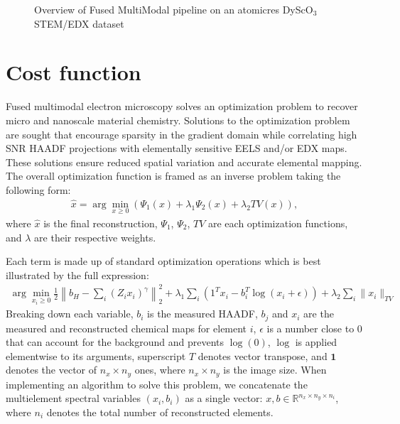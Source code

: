 \documentclass[letterpaper,10pt,english]{jupyterBook}
\let\sphinxpxdimen\pdfpxdimen\else\newdimen\sphinxpxdimen
\begin{document}
\sphinxstepscope

\begin{figure}[htbp]
\centering
\capstart

\noindent\sphinxincludegraphics[width=700\sphinxpxdimen]{{figure_1_math}.png}
\caption{Overview of Fused Multi\sphinxhyphen{}Modal pipeline on an atomic\sphinxhyphen{}res DyScO\(_3\) STEM/EDX dataset}\label{\detokenize{02_math:fig-math}}\end{figure}


\chapter{Cost function}
\label{\detokenize{02_math:cost-function}}\label{\detokenize{02_math::doc}}
\sphinxAtStartPar
Fused multi\sphinxhyphen{}modal electron microscopy solves an optimization problem to recover micro\sphinxhyphen{} and nanoscale material chemistry. Solutions to the optimization problem are sought that encourage sparsity in the gradient domain while correlating high SNR HAADF projections with elementally sensitive EELS and/or EDX maps. These solutions ensure reduced spatial variation and accurate elemental mapping. The overall optimization function is framed as an inverse problem taking the following form:
\begin{equation*}
\begin{split}
\hat{x} = \arg\min_{x\geq 0} \left( \Psi_1(x) + \lambda_1 \Psi_2(x) + \lambda_2 TV(x) \right),
\end{split}
\end{equation*}
\sphinxAtStartPar
where \(\hat{x}\) is the final reconstruction, \(\Psi_1\), \(\Psi_2\), \(TV\) are each optimization functions, and \(\lambda\) are their respective weights.

\sphinxAtStartPar
Each term is made up of standard optimization operations which is best illustrated by the full expression:
\begin{equation*}
\begin{split}
\arg \min_{x_i \geq 0} \frac{1}{2} \left\| b_H - \sum_i (Z_i x_i)^\gamma \right\|_2^2 
+ \lambda_1 \sum_i (1^T x_i - b_i^T \log(x_i + \epsilon))
+ \lambda_2 \sum_i \| x_i \|_{TV} 
\end{split}
\end{equation*}
\sphinxAtStartPar
Breaking down each variable, \(b_i\) is the measured HAADF, \(b_j\) and \(x_i\) are the measured and reconstructed chemical maps for element \(i\), \(\epsilon\) is a number close to 0 that can account for the background and prevents \(\log(0)\), \(\log\) is applied element\sphinxhyphen{}wise to its arguments, superscript \(T\) denotes vector transpose, and \(\mathbf{1}\) denotes the vector of \(n_x \times n_y\) ones, where \(n_x \times n_y\) is the image size. When implementing an algorithm to solve this problem, we concatenate the multi\sphinxhyphen{}element spectral variables \((x_i, b_i)\) as a single vector: \(x, b \in \mathbb{R}^{n_x \times n_y \times n_i}\), where \(n_i\) denotes the total number of reconstructed elements.
\end{document}
